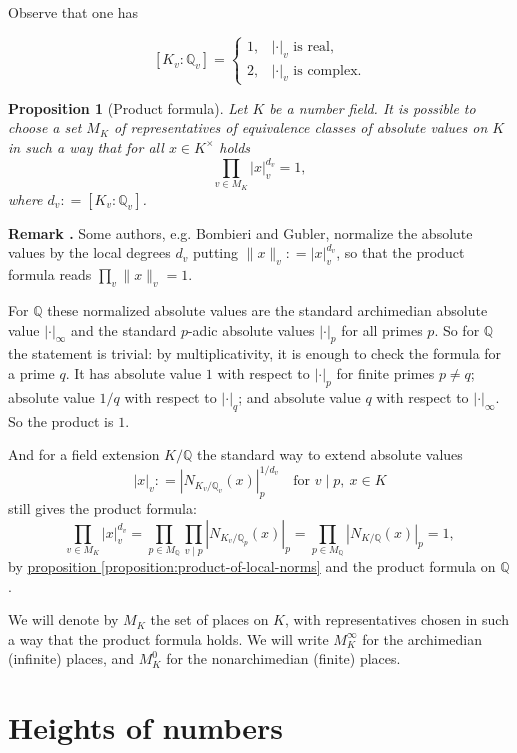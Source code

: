 \documentclass{article}
\newcommand{\refref}[2]{\hyperref[#2]{#1 \ref*{#2}}}
\newtheorem{proposition}{Proposition}[section]
\theoremstyle{definition}
\newcommand{\dfn}{\mathrel{\mathop:}=}
\newcommand{\QQ}{\mathbb{Q}}
\newenvironment{remark}
{ \begin{shaded}\begingroup\small\noindent\refstepcounter{proposition}\textbf{Remark \theproposition.} }
{ \endgroup\end{shaded} }
\begin{document}
Observe that one has

\[ [K_v : \QQ_v] =
  \left\{\begin{array}{ll}
           1, & |\cdot|_v \text{ is real},\\
           2, & |\cdot|_v \text{ is complex}.
         \end{array}\right. \]

\begin{proposition}[Product formula]
  Let $K$ be a number field. It is possible to choose a set $M_K$ of
  representatives of equivalence classes of absolute values on $K$ in such a way
  that for all $x \in K^\times$ holds
  $$\prod_{v\in M_K} |x|_v^{d_v} = 1,$$
  where $d_v \dfn [K_v : \QQ_v]$.
\end{proposition}

\begin{remark}
  Some authors, e.g. Bombieri and Gubler, normalize the absolute values by the
  local degrees $d_v$ putting $\|x\|_v \dfn |x|^{d_v}_v$, so that the product
  formula reads $\prod_v \|x\|_v = 1$.
\end{remark}

For $\QQ$ these normalized absolute values are the standard archimedian absolute
value $|\cdot|_\infty$ and the standard $p$-adic absolute values $|\cdot|_p$ for
all primes $p$. So for $\QQ$ the statement is trivial: by multiplicativity, it
is enough to check the formula for a prime $q$. It has absolute value $1$ with
respect to $|\cdot|_p$ for finite primes $p \ne q$; absolute value $1/q$ with
respect to $|\cdot|_q$; and absolute value $q$ with respect to
$|\cdot|_\infty$. So the product is $1$.

And for a field extension $K/\QQ$ the standard way to extend absolute values
$$|x|_v \dfn |N_{K_v/\QQ_v} (x)|_p^{1/d_v} \quad \text{for }v\mid p, ~ x \in K$$
still gives the product formula:
\[ \prod_{v\in M_K} |x|_v^{d_v} =
  \prod_{p\in M_\QQ} \prod_{v\mid p} |N_{K_v/\QQ_p} (x)|_p =
  \prod_{p\in M_\QQ} |N_{K/\QQ} (x)|_p = 1, \]
by \refref{proposition}{proposition:product-of-local-norms} and the product
formula on $\QQ$.

\vspace{1em}

We will denote by $M_K$ the set of places on $K$, with representatives chosen in
such a way that the product formula holds. We will write $M_K^\infty$ for the
archimedian (infinite) places, and $M_K^0$ for the nonarchimedian (finite)
places.

\section{Heights of numbers}
\end{document}
